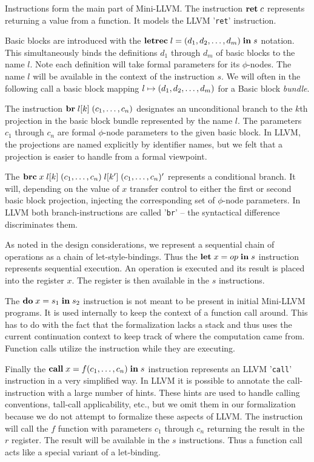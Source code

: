 \documentclass[a4paper, oneside, 10pt, draft]{memoir}
\begin{document}
Instructions form the main part of Mini-LLVM. The instruction
$\mathbf{ret} \; c$ represents returning a value from a function. It models the
LLVM '\texttt{ret}' instruction.

Basic blocks are introduced with the $\mathbf{letrec} \; l = (d_1, d_2, \dotsc, d_m) \; \mathbf{in} \; s$
notation. This simultaneously binds the definitions $d_1$ through
$d_m$ of basic blocks to the name $l$. Note each definition will take
formal parameters for its $\phi$-nodes. The name $l$ will be
available in the context of the instruction $s$. We will often in the
following call a basic block mapping $l \mapsto (d_1, d_2, \dotsc, d_m)$
for a Basic block \emph{bundle}.

The instruction $\mathbf{br} \; l[k] \; (c_1, \dotsc, c_n)$ designates an
unconditional branch to the $k$th projection in the basic block bundle
represented by the name $l$. The parameters $c_1$ through $c_n$ are
formal $\phi$-node parameters to the given basic block. In LLVM, the
projections are named explicitly by identifier names, but we felt that
a projection is easier to handle from a formal viewpoint.

The $\mathbf{brc} \; x \; l[k] \; (c_1, \dotsc, c_n) \; l[{k'}] \; (c_1, \dotsc, c_n)'$ represents a conditional
branch. It will, depending on the value of $x$ transfer control to
either the first or second basic block projection, injecting the
corresponding set of $\phi$-node parameters. In LLVM both
branch-instructions are called '\texttt{br}' -- the syntactical
difference discriminates them.

As noted in the design considerations, we represent a sequential chain
of operations as a chain of let-style-bindings. Thus the
$\mathbf{let} \; x = op \; \mathbf{in} \; s$ instruction represents sequential execution. An
operation is executed and its result is placed into the register
$x$. The register is then available in the $s$ instructions.

The $\mathbf{do} \; x = s_1 \; \mathbf{in} \; s_2$ instruction is not meant to be present in
initial Mini-LLVM programs. It is used internally to keep the context
of a function call around. This has to do with the fact that the
formalization lacks a stack and thus uses the current continuation
context to keep track of where the computation came from. Function
calls utilize the instruction while they are executing.

Finally the $\mathbf{call} \; x = f (c_1, \dotsc, c_n)\; \mathbf{in} \; s$ instruction
represents an LLVM '\texttt{call}' instruction in a very simplified
way. In LLVM it is possible to annotate the call-instruction with a
large number of hints. These hints are used to handle calling
conventions, tall-call applicability, etc., but we omit them in our
formalization because we do not attempt to formalize these aspects of
LLVM. The instruction will call the $f$ function with parameters $c_1$
through $c_n$ returning the result in the $r$ register. The result
will be available in the $s$ instructions. Thus a function call acts
like a special variant of a let-binding.
\end{document}
